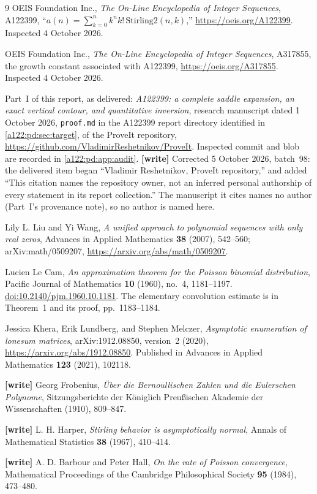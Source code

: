 \documentclass[11pt,letterpaper]{article}
\numberwithin{equation}{subsection}
\theoremstyle{definition}
\theoremstyle{remark}
\theoremstyle{plain}
\begin{document}
\renewcommand{\refname}{References for Part~II}
\begin{thebibliography}{9}
OEIS Foundation Inc., \emph{The On-Line Encyclopedia of Integer Sequences},
A122399, ``$a(n)=\sum_{k=0}^n k^n k!\,\mathrm{Stirling2}(n,k)$,''
\url{https://oeis.org/A122399}. Inspected 4 October 2026.

OEIS Foundation Inc., \emph{The On-Line Encyclopedia of Integer Sequences},
A317855, the growth constant associated with A122399,
\url{https://oeis.org/A317855}. Inspected 4 October 2026.

Part~I of this report, as delivered: \emph{A122399: a complete saddle
expansion, an exact vertical contour, and quantitative inversion},
research manuscript dated 1 October 2026, \texttt{proof.md} in the
A122399 report directory identified in \cref{a122:pd:sec:target}, of
the ProveIt repository,
\url{https://github.com/VladimirReshetnikov/ProveIt}.
Inspected commit and blob are recorded in \cref{a122:pd:app:audit}.
\textbf{[write]} Corrected 5 October 2026, batch~98: the delivered item
began ``Vladimir Reshetnikov, ProveIt repository,'' and added ``This
citation names the repository owner, not an inferred personal authorship
of every statement in its report collection.'' The manuscript it cites
names no author (Part~I's provenance note), so no author is named here.

Lily L. Liu and Yi Wang,
\emph{A unified approach to polynomial sequences with only real zeros},
Advances in Applied Mathematics \textbf{38} (2007), 542--560;
arXiv:math/0509207,
\url{https://arxiv.org/abs/math/0509207}.

Lucien Le Cam,
\emph{An approximation theorem for the Poisson binomial distribution},
Pacific Journal of Mathematics \textbf{10} (1960), no.~4, 1181--1197.
\href{https://doi.org/10.2140/pjm.1960.10.1181}{doi:10.2140/pjm.1960.10.1181}.
The elementary convolution estimate is in Theorem~1 and its proof,
pp.~1183--1184.

Jessica Khera, Erik Lundberg, and Stephen Melczer,
\emph{Asymptotic enumeration of lonesum matrices},
arXiv:1912.08850, version~2 (2020),
\url{https://arxiv.org/abs/1912.08850}.
Published in Advances in Applied Mathematics \textbf{123} (2021), 102118.

\textbf{[write]} Georg Frobenius,
\emph{\"Uber die Bernoullischen Zahlen und die Eulerschen Polynome},
Sitzungsberichte der K\"oniglich Preu\ss ischen Akademie der
Wissenschaften (1910), 809--847.

\textbf{[write]} L. H. Harper,
\emph{Stirling behavior is asymptotically normal},
Annals of Mathematical Statistics \textbf{38} (1967), 410--414.

\textbf{[write]} A. D. Barbour and Peter Hall,
\emph{On the rate of Poisson convergence},
Mathematical Proceedings of the Cambridge Philosophical Society
\textbf{95} (1984), 473--480.
\end{thebibliography}
\end{document}
